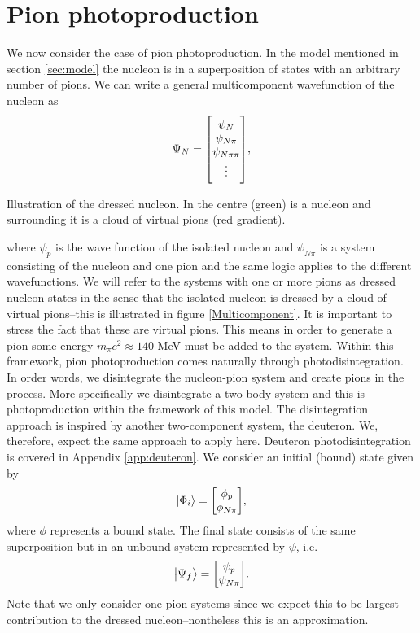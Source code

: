 \chapter{Pion photoproduction}\label{sec:dipoleapprox}

We now consider the case of pion photoproduction. In the model mentioned in section \ref{sec:model} the nucleon is in a superposition of states with an arbitrary number of pions. We can write a general multicomponent wavefunction of the nucleon as 
\begin{equation}
    \Psi_N = \mqty[\psi_N \\ \psi_{N\pi} \\
    \psi_{N\pi \pi} \\
    \vdots],
\end{equation}
\begin{marginfigure}
\centering

\caption{Illustration of the dressed nucleon. In the centre (green) is a nucleon and surrounding it is a cloud of virtual pions (red gradient). }
\label{Multicomponent}
\end{marginfigure}
where $\psi_p$ is the wave function of the isolated nucleon and $\psi_{N\pi}$ is a system consisting of the nucleon and one pion and the same logic applies to the different wavefunctions. We will refer to the systems with one or more pions as dressed nucleon states in the sense that the isolated nucleon is dressed by a cloud of virtual pions--this is illustrated in figure \ref{Multicomponent}. It is important to stress the fact that these are virtual pions. This means in order to generate a pion some energy $ m_\pi c^2 \approx 140$ MeV must be added to the system. Within this framework, pion photoproduction comes naturally through photodisintegration. In order words, we disintegrate the nucleon-pion system and create pions in the process. More specifically we disintegrate a two-body system and this is photoproduction within the framework of this model. The disintegration approach is inspired by another two-component system, the deuteron. We, therefore, expect the same approach to apply here. Deuteron photodisintegration is covered in Appendix \ref{app:deuteron}. We consider an initial (bound) state given by
\begin{equation} \label{phii}
    \ket{\Phi_i} = \mqty[\phi_p \\ \phi_{N\pi}],
\end{equation}
where $\phi$ represents a bound state. The final state consists of the same superposition but in an unbound system represented by $\psi$, i.e.
\begin{equation} \label{psif}
    \ket{\Psi_f} = \mqty[\psi_p \\ \psi_{N\pi}].
\end{equation}
Note that we only consider one-pion systems since we expect this to be largest contribution to the dressed nucleon--nontheless this is an approximation. 

